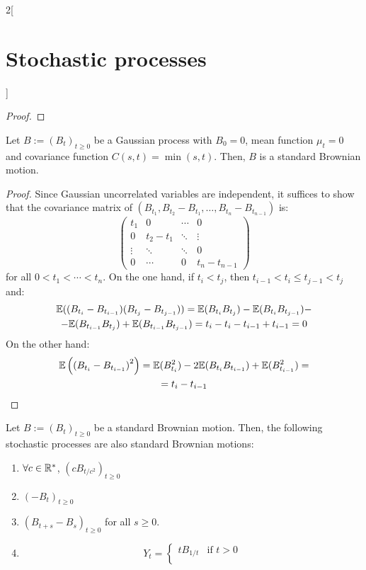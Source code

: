 \documentclass[../../../main_math.tex]{subfiles}
\begin{document}
\begin{multicols}{2}[\section{Stochastic processes}]
\begin{proof}
  \end{proof}
  \begin{proposition}
    Let $B:={(B_t)}_{t\geq 0}$ be a Gaussian process with $B_0=0$, mean function $\mu_t=0$ and covariance function $C(s,t)=\min(s,t)$. Then, $B$ is a standard Brownian motion.
  \end{proposition}
  \begin{proof}
    Since Gaussian uncorrelated variables are independent, it suffices to show that the covariance matrix of $(B_{t_1}, B_{t_2}-B_{t_1}, \ldots, B_{t_n}-B_{t_{n-1}})$ is:
    $$
      \begin{pmatrix}
        t_1    & 0       & \cdots & 0            \\
        0      & t_2-t_1 & \ddots & \vdots       \\
        \vdots & \ddots  & \ddots & 0            \\
        0      & \cdots  & 0      & t_n- t_{n-1}
      \end{pmatrix}
    $$
    for all $0<t_1<\cdots<t_n$. On the one hand, if $t_i<t_j$, then $t_{i-1}<t_i\leq t_{j-1}<t_j$ and:
    \begin{multline*}
      \mathbb{E}((B_{t_i}-B_{t_{i-1}})(B_{t_j}-B_{t_{j-1}}))=\mathbb{E}(B_{t_i}B_{t_j})-\mathbb{E}(B_{t_i}B_{t_{j-1}})-\\-\mathbb{E}(B_{t_{i-1}}B_{t_j})+\mathbb{E}(B_{t_{i-1}}B_{t_{j-1}})=t_i-t_{i}-t_{i-1}+t_{i-1}=0
    \end{multline*}
    On the other hand:
    \begin{multline*}
      \mathbb{E}\left({(B_{t_i}-B_{t_{i-1}})}^2\right)= \mathbb{E}(B_{t_i}^2)-2\mathbb{E}(B_{t_i}B_{t_{i-1}})+\mathbb{E}(B_{t_{i-1}}^2)=\\=t_i-t_{i-1}
    \end{multline*}
  \end{proof}
  \begin{proposition}
    Let $B:={(B_t)}_{t\geq 0}$ be a standard Brownian motion. Then, the following stochastic processes are also standard Brownian motions:
    \begin{enumerate}
      \item $\forall c\in \RR^*$, ${(cB_{t/c^2})}_{t\geq 0}$
      \item ${(-B_t)}_{t\geq 0}$
      \item ${(B_{t+s}-B_s)}_{t\geq 0}$ for all $s\geq 0$.
      \item $$
              Y_t = \begin{cases}
                t B_{1/t} & \text{if } t>0 \\

\end{cases}$$
\end{enumerate}
\end{proposition}
\end{multicols}
\end{document}
